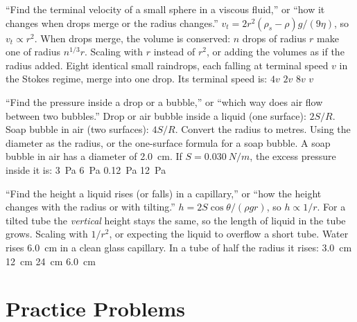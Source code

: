 {``Find the terminal velocity of a small sphere in a viscous fluid,'' or ``how it changes when drops
merge or the radius changes.''}
{$v_t=2r^2(\rho_s-\rho)g/(9\eta)$, so $v_t\propto r^2$. When drops merge, the volume is conserved: $n$
drops of radius $r$ make one of radius $n^{1/3}r$.}
{Scaling with $r$ instead of $r^2$, or adding the volumes as if the radius added.}
{Eight identical small raindrops, each falling at terminal speed $v$ in the Stokes regime, merge into one
drop. Its terminal speed is:}
{$4v$}
{$2v$}
{$8v$}
{$v$}

{``Find the pressure inside a drop or a bubble,'' or ``which way does air flow between two bubbles.''}
{Drop or air bubble inside a liquid (one surface): $2S/R$. Soap bubble in air (two surfaces): $4S/R$.
Convert the radius to metres.}
{Using the diameter as the radius, or the one-surface formula for a soap bubble.}
{A soap bubble in air has a diameter of \SI{2.0}{cm}. If $S=\SI{0.030}{N/m}$, the excess pressure inside
it is:}
{\SI{3}{Pa}}
{\SI{6}{Pa}}
{\SI{0.12}{Pa}}
{\SI{12}{Pa}}

{``Find the height a liquid rises (or falls) in a capillary,'' or ``how the height changes with the radius or
with tilting.''}
{$h=2S\cos\theta/(\rho gr)$, so $h\propto1/r$. For a tilted tube the \emph{vertical} height stays the same,
so the length of liquid in the tube grows.}
{Scaling with $1/r^2$, or expecting the liquid to overflow a short tube.}
{Water rises \SI{6.0}{cm} in a clean glass capillary. In a tube of half the radius it rises:}
{\SI{3.0}{cm}}
{\SI{12}{cm}}
{\SI{24}{cm}}
{\SI{6.0}{cm}}

\section{Practice Problems}\label{sec:fluids-practice}

